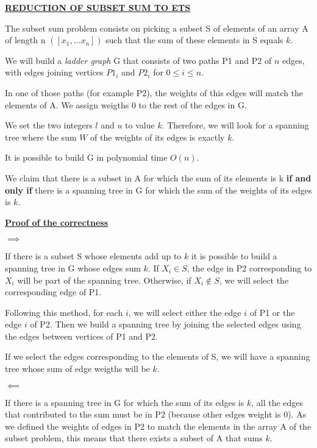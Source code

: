 \vspace{5mm}
\underline{\textbf{REDUCTION OF SUBSET SUM TO ETS}}

The subset sum problem consists on picking a subset S of elements of an array A of length n $([x_1,...x_n])$ such that the sum of these elements in S equals $k$.


We will build a \textit{ladder graph} G that consists of two paths P1 and P2 of $n$ edges, with edges joining vertices $P1_i$ and $P2_i$ for $0 \le i \le n$.



In one of those paths (for example P2), the weights of this edges will match the elements of A. We assign weigths 0 to the rest of the edges in G.


We set the two integers $l$ and $u$ to value $k$. Therefore, we will look for a spanning tree where the sum $W$ of the weights of its edges is exactly $k$.


It is possible to build G in polynomial time $O(n)$.


We claim that there is a subset in A for which the sum of its elements is k \textbf{if and only if} there is a spanning tree in G for which the sum of the weights of its edges is $k$.

\vspace{5mm}
\underline{\textbf{Proof of the correctness}}

$\implies$

If there is a subset S whose elements add up to $k$ it is possible to build a spanning tree in G whose edges sum $k$. If $X_i \in S$, the edge in P2 corresponding to $X_i$ will be part of the spanning tree. Otherwise, if $X_i \notin S$, we will select the corresponding edge of P1.


Following this method, for each $i$, we will select either the edge $i$ of P1 or the edge $i$ of P2. Then we build a spanning tree by joining the selected edges using the edges between vertices of P1 and P2.


If we select the edges corresponding to the elements of S, we will have a spanning tree whose sum of edge weigths will be $k$.

$\impliedby$

If there is a spanning tree in G for which the sum of its edges is $k$, all the edges that contributed to the sum must be in P2 (because other edges weight is 0). As we defined the weights of edges in P2 to match the elements in the array A of the subset problem, this means that there exists a subset of A that sums $k$.

